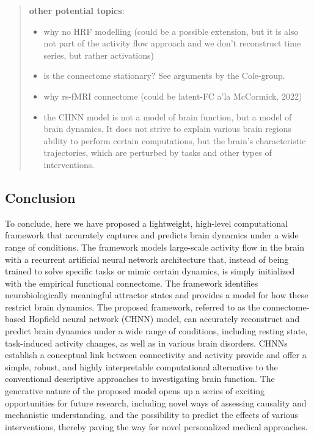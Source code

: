 \documentclass{article}
\begin{document}
\begin{quote}
\textbf{other potential topics}:

\begin{itemize}
\item why no HRF modelling (could be a possible extension, but it is also not part of the activity flow approach and we don't reconstruct time series, but rather activations)
\item is the connectome stationary? See arguments by the Cole-group.
\item why rs-fMRI connectome (could be latent-FC a'la McCormick, 2022)
\item the CHNN model is not a model of brain function, but a model of brain dynamics. It does not strive to explain various brain regions ability to perform certain computations, but the brain's characteristic trajectories, which are perturbed by tasks and other types of interventions.
\end{itemize}
\end{quote}

\subsection{Conclusion}\label{Conclusion}

To conclude, here we have proposed a lightweight, high-level computational framework that accurately captures and predicts brain dynamics
under a wide range of conditions. The framework models large-scale activity flow in the brain with a recurrent
artificial neural network architecture that, instead of being trained to solve specific tasks or mimic certain dynamics,
is simply initialized with the empirical functional connectome. The framework identifies neurobiologically meaningful
attractor states and provides a model for how these restrict brain dynamics. The proposed framework, referred to as the
connectome-based Hopfield neural network (CHNN) model, can accurately reconstruct and predict brain dynamics under a wide range of
conditions, including resting state, task-induced activity changes, as well as in various brain disorders. CHNNs establish a conceptual link between connectivity and activity provide and offer a simple, robust, and highly interpretable computational alternative to the conventional descriptive approaches to investigating brain function. The generative nature of the proposed model opens up a series of exciting opportunities for future research, including novel ways of assessing causality and mechanistic understanding, and the possibility to predict the effects of various interventions, thereby paving the way for novel personalized medical approaches.
\end{document}
